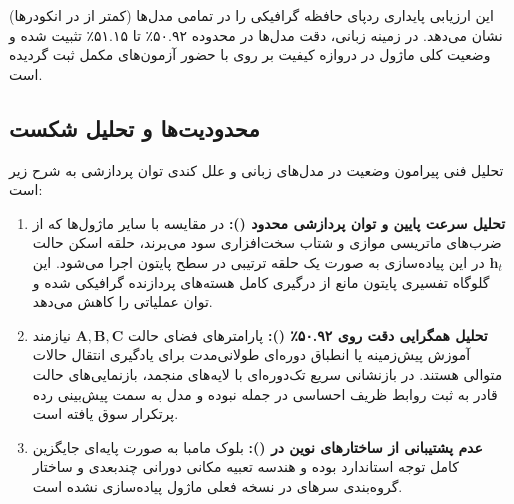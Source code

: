 این ارزیابی پایداری ردپای حافظه گرافیکی را در تمامی مدل‌ها (کمتر از  در انکودرها) نشان می‌دهد. در زمینه زبانی، دقت مدل‌ها در محدوده ۵۰.۹۲٪ تا ۵۱.۱۵٪ تثبیت شده و وضعیت کلی ماژول در دروازه کیفیت بر روی  با حضور آزمون‌های مکمل ثبت گردیده است.

\subsection{محدودیت‌ها و تحلیل شکست}
تحلیل فنی پیرامون وضعیت  در مدل‌های زبانی و علل کندی توان پردازشی به شرح زیر است:
\begin{enumerate}
    \item \textbf{تحلیل سرعت پایین و توان پردازشی محدود ():} در مقایسه با سایر ماژول‌ها که از ضرب‌های ماتریسی موازی و شتاب سخت‌افزاری  سود می‌برند، حلقه اسکن حالت $\mathbf{h}_t$ در این پیاده‌سازی به صورت یک حلقه ترتیبی در سطح پایتون اجرا می‌شود. این گلوگاه تفسیری پایتون مانع از درگیری کامل هسته‌های  پردازنده گرافیکی شده و توان عملیاتی را کاهش می‌دهد.
    \item \textbf{تحلیل همگرایی دقت روی ۵۰.۹۲٪ ():} پارامترهای فضای حالت $\mathbf{A}, \mathbf{B}, \mathbf{C}$ نیازمند آموزش پیش‌زمینه یا انطباق دوره‌ای طولانی‌مدت برای یادگیری انتقال حالات متوالی هستند. در بازنشانی سریع تک‌دوره‌ای با لایه‌های منجمد، بازنمایی‌های حالت قادر به ثبت روابط ظریف احساسی در جمله نبوده و مدل به سمت پیش‌بینی رده پرتکرار سوق یافته است.
    \item \textbf{عدم پشتیبانی از ساختارهای نوین در  ():} بلوک مامبا به صورت پایه‌ای جایگزین کامل توجه استاندارد بوده و هندسه تعبیه مکانی دورانی چندبعدی و ساختار گروه‌بندی سرهای  در نسخه فعلی ماژول پیاده‌سازی نشده است.
\end{enumerate}
